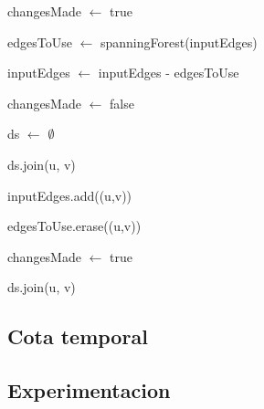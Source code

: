\begin{algorithm}[H]
		\NoCaptionOfAlgo
		\caption{}
		
		changesMade $\leftarrow$ true
		
		edgesToUse $\leftarrow$ spanningForest(inputEdges)

		inputEdges $\leftarrow$ inputEdges - edgesToUse

		{
			changesMade $\leftarrow$ false

			ds $\leftarrow$ $\emptyset$

			{
				ds.join(u, v)
			}

			{
					{
						inputEdges.add((u,v))

						edgesToUse.erase((u,v))

						changesMade $\leftarrow$ true
					}
					{
						ds.join(u, v)
					}
			}



		}

	\end{algorithm}

\subsection{Cota temporal}

\subsection{Experimentacion}

\pagebreak



 



